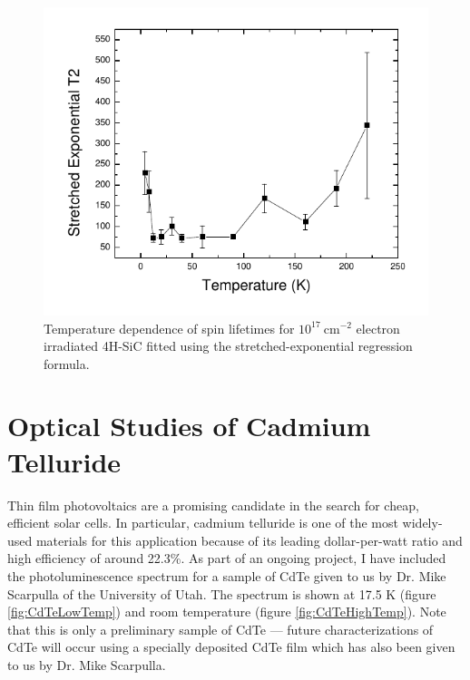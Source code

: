 \documentclass[oneside]{BYUPhys}
\begin{document}
\begin{appendices}
\begin{figure}
    \centerline{\includegraphics{e17-lifetimes-stretched}}
    \caption[Electron Irradiated SiC Temperature Dependence for Single-Exponential Spin Coherence]{\label{fig:SiCElectronStretched}
     Temperature dependence of spin lifetimes for $10^{17}~\text{cm}^{-2}$ electron irradiated 4H-SiC fitted using the stretched-exponential regression formula.}
 \end{figure}

\chapter{Optical Studies of Cadmium Telluride}
\label{sec:appendc}

Thin film photovoltaics are a promising candidate in the search for cheap, efficient solar cells.  In particular, cadmium telluride is one of the most widely-used materials for this application because of its leading dollar-per-watt ratio and high efficiency of around 22.3\%. As part of an ongoing project, I have included the photoluminescence spectrum for a sample of CdTe given to us by Dr. Mike Scarpulla of the University of Utah. The spectrum is shown at 17.5 K (figure \ref{fig:CdTeLowTemp}) and room temperature (figure \ref{fig:CdTeHighTemp}). Note that this is only a preliminary sample of CdTe --- future characterizations of CdTe will occur using a specially deposited CdTe film which has also been given to us by Dr. Mike Scarpulla.


\end{appendices}
\end{document}
